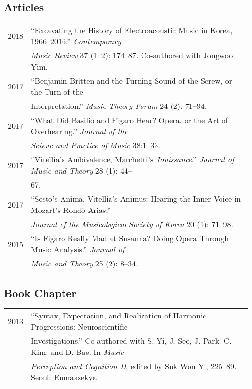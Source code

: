 \documentclass[letter,11pt]{article}
\begin{document}
  \subsection*{Articles}
  \hspace*{-0.25cm}
  \begin{tabular}{p{2.5cm} p{12.5cm}}
    2018 & ``Excavating the History of Electroacoustic Music in Korea,
    1966--2016.'' \textit{Contemporary}\\
    & \textit{Music Review} 37 (1--2): 174--87. Co-authored with Jongwoo
    Yim.\\[2mm]
    
    2017 & ``Benjamin Britten and the Turning Sound of the Screw, or the Turn
    of the\\
    & Interpretation.'' \textit{Music Theory Forum} 24 (2): 71--94.\\[2mm]
    
    2017 & ``What Did Basilio and Figaro Hear? Opera, or the Art of
    Overhearing.'' \textit{Journal of the}\\
    & \textit{Scienc and Practice of Music} 38:1--33.\\[2mm]
    
    2017 & ``Vitellia's Ambivalence, Marchetti's \textit{Jouissance}.''
    \textit{Journal of Music and Theory} 28 (1): 44--\\
    & 67.\\[2mm]
    
    2017 & ``Sesto's Anima, Vitellia's Animus: Hearing the Inner Voice in
    Mozart's Rond\`{o} Arias.''\\
    & \textit{Journal of the Musicological Society of Korea} 20 (1):
    71--98.\\[2mm]
    
    2015 & ``Is Figaro Really Mad at Susanna? Doing Opera Through Music
    Analysis.'' \textit{Journal of}\\
    & \textit{Music and Theory} 25 (2): 8--34.
  \end{tabular}
    
  \subsection*{Book Chapter}
  \hspace*{-0.25cm}
  \begin{tabular}{p{2.5cm} p{12.5cm}}
    2013 & “Syntax, Expectation, and Realization of Harmonic Progressions:
    Neuroscientific\\
    & Investigations.” Co-authored with S. Yi, J. Seo, J. Park, C. Kim, and D.
    Bae. In \textit{Music} \\
    & \textit{Perception and Cognition II}, edited by Suk Won Yi, 225–89.
    Seoul: Eumaksekye.
  \end{tabular}
    
\end{document}
